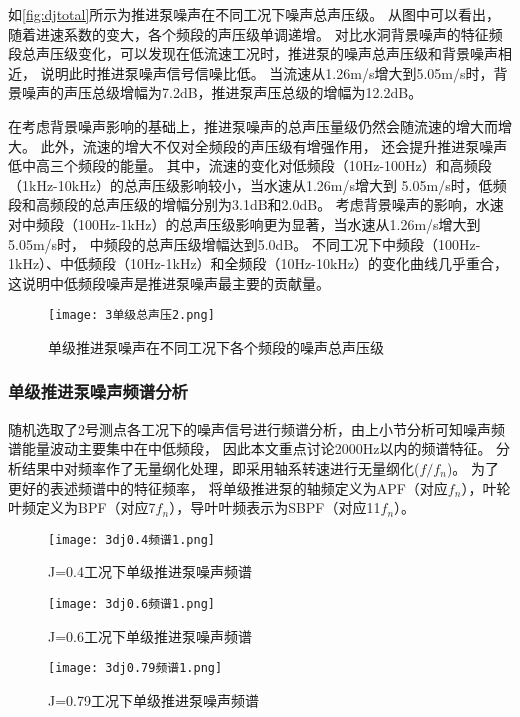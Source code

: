 如\autoref{fig:djtotal}所示为推进泵噪声在不同工况下噪声总声压级。
从图中可以看出，随着进速系数的变大，各个频段的声压级单调递增。
对比水洞背景噪声的特征频段总声压级变化，可以发现在低流速工况时，推进泵的噪声总声压级和背景噪声相近，
说明此时推进泵噪声信号信噪比低。
当流速从1.26m/s增大到5.05m/s时，背景噪声的声压总级增幅为7.2dB，推进泵声压总级的增幅为12.2dB。

在考虑背景噪声影响的基础上，推进泵噪声的总声压量级仍然会随流速的增大而增大。
此外，流速的增大不仅对全频段的声压级有增强作用，
还会提升推进泵噪声低中高三个频段的能量。
其中，流速的变化对低频段（10Hz-100Hz）和高频段（1kHz-10kHz）的总声压级影响较小，当水速从1.26m/s增大到
5.05m/s时，低频段和高频段的总声压级的增幅分别为3.1dB和2.0dB。
考虑背景噪声的影响，水速对中频段（100Hz-1kHz）的总声压级影响更为显著，当水速从1.26m/s增大到5.05m/s时，
中频段的总声压级增幅达到5.0dB。
不同工况下中频段（100Hz-1kHz）、中低频段（10Hz-1kHz）和全频段（10Hz-10kHz）的变化曲线几乎重合，
这说明中低频段噪声是推进泵噪声最主要的贡献量。
\begin{figure}[htbp]
    \centering
    \texttt{[image: 3单级总声压2.png]}
    \caption{\label{fig:djtotal}单级推进泵噪声在不同工况下各个频段的噪声总声压级}
\end{figure}
\subsubsection{单级推进泵噪声频谱分析}
随机选取了2号测点各工况下的噪声信号进行频谱分析，由上小节分析可知噪声频谱能量波动主要集中在中低频段，
因此本文重点讨论2000Hz以内的频谱特征。
分析结果中对频率作了无量纲化处理，即采用轴系转速进行无量纲化($f/f_n$)。
为了更好的表述频谱中的特征频率，
将单级推进泵的轴频定义为APF（对应$f_n$），叶轮叶频定义为BPF（对应7$f_n$），导叶叶频表示为SBPF（对应11$f_n$）。
\begin{figure}[htbp]
    \centering
    \texttt{[image: 3dj0.4频谱1.png]}
    \caption{\label{fig:dj0.4}J=0.4工况下单级推进泵噪声频谱}
\end{figure}
\begin{figure}[htbp]
    \centering
    \texttt{[image: 3dj0.6频谱1.png]}
    \caption{\label{fig:dj0.6}J=0.6工况下单级推进泵噪声频谱}
\end{figure}
\begin{figure}[htbp]
    \centering
    \texttt{[image: 3dj0.79频谱1.png]}
    \caption{\label{fig:dj0.79}J=0.79工况下单级推进泵噪声频谱}
\end{figure}


